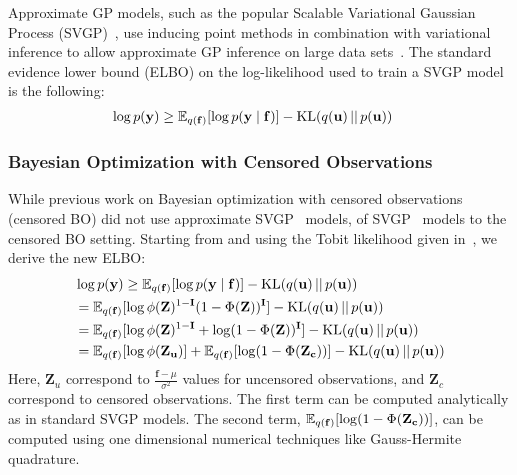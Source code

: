 Approximate GP models, such as the popular Scalable Variational Gaussian Process (SVGP)~\cite{svgp}, use inducing point methods in combination with variational inference to allow approximate GP inference on large data sets~\cite{hensman2013gaussian,titsias2009variational}. The standard evidence lower bound (ELBO) on the log-likelihood used to train a SVGP model is the following:
% 
\begin{align}
\label{eq: svgp}
\log p(\mathbf{y}) & \geq  \mathbb{E}_{q(\mathbf{f})}[\log p(\mathbf{y} \mid \mathbf{f})] - \textrm{KL}(q(\mathbf{u})\,||\,p(\mathbf{u})) 
\end{align}
%



\subsubsection{Bayesian Optimization with Censored Observations} \label{sec:censored_observations}

While previous work on Bayesian optimization with censored observations (censored BO) did not use approximate SVGP~\cite{svgp} models,  of SVGP~\cite{svgp} models to the censored BO setting. 
Starting from  and using the Tobit likelihood given in~, we derive the new ELBO:
%
\begin{equation*}
\centering
\begin{aligned}
& \log p(\by) \geq  \mathbb{E}_{q(\bfn)}[\log p(\by \mid \bfn)] - \textrm{KL}(q(\bu)\,||\,p(\bu)) \\
			& = \mathbb{E}_{q(\bfn)}[\log \phi(\mathbf{Z})^{1-\mathbf{I}}(1-\Phi(\mathbf{Z}))^\mathbf{I}] - \textrm{KL}(q(\bu)\,||\,p(\bu)) \\
			& = \mathbb{E}_{q(\bfn)}[\log \phi(\mathbf{Z})^{1-\mathbf{I}} + \log(1-\Phi(\mathbf{Z}))^\mathbf{I}] - \textrm{KL}(q(\bu)\,||\,p(\bu)) \\
            & = \mathbb{E}_{q(\bfn)}[\log \phi(\mathbf{Z_u})] + \mathbb{E}_{q(\bfn)}[\log(1-\Phi(\mathbf{Z_c}))] - \textrm{KL}(q(\bu)\,||\,p(\bu)) 
\end{aligned}
\end{equation*}
%
Here, $\mathbf{Z}_{u}$ correspond to $\frac{\mathbf{f} - \mu}{\sigma^2}$ values for uncensored observations, and $\mathbf{Z}_{c}$ correspond to censored observations. The first term
can be computed analytically as in standard SVGP models. The second term, $\mathbb{E}_{q(\mathbf{f})}[\log(1-\Phi(\mathbf{Z_c}))]$, can be computed using one dimensional numerical techniques like Gauss-Hermite quadrature.  

